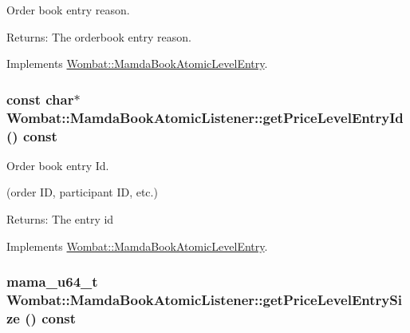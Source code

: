 Order book entry reason. 

\begin{Desc}
\item[Returns:]The orderbook entry reason. \end{Desc}


Implements \hyperlink{classWombat_1_1MamdaBookAtomicLevelEntry_222418d457ef30752c22e8aa63a61b50}{Wombat::Mamda\-Book\-Atomic\-Level\-Entry}.\hypertarget{classWombat_1_1MamdaBookAtomicListener_fde019fedeb06b7edcb5dbad7cb2b598}{
\subsubsection[getPriceLevelEntryId]{\setlength{\rightskip}{0pt plus 5cm}const char$\ast$ Wombat::Mamda\-Book\-Atomic\-Listener::get\-Price\-Level\-Entry\-Id () const}}
\label{classWombat_1_1MamdaBookAtomicListener_fde019fedeb06b7edcb5dbad7cb2b598}


Order book entry Id. 

(order ID, participant ID, etc.)

\begin{Desc}
\item[Returns:]The entry id \end{Desc}


Implements \hyperlink{classWombat_1_1MamdaBookAtomicLevelEntry_38c3e2bffcc1bce4ff9453e278141d13}{Wombat::Mamda\-Book\-Atomic\-Level\-Entry}.\hypertarget{classWombat_1_1MamdaBookAtomicListener_47bcfe27887db5dab390d398706f96fe}{
\subsubsection[getPriceLevelEntrySize]{\setlength{\rightskip}{0pt plus 5cm}mama\_\-u64\_\-t Wombat::Mamda\-Book\-Atomic\-Listener::get\-Price\-Level\-Entry\-Size () const}}
\label{classWombat_1_1MamdaBookAtomicListener_47bcfe27887db5dab390d398706f96fe}


